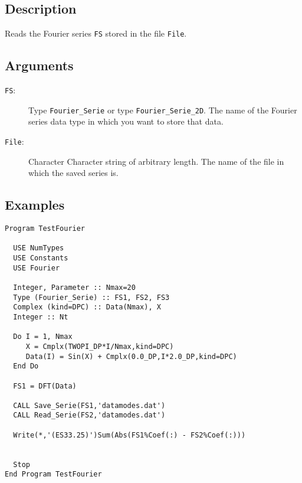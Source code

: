 \subsection{Description}

Reads the Fourier series \texttt{FS} stored in the file \texttt{File}.

\subsection{Arguments}

\begin{description}
\item[\texttt{FS}:] Type \texttt{Fourier\_Serie} or type
  \texttt{Fourier\_Serie\_2D}. The name of the Fourier series data
  type in which you want to store that data.
\item[\texttt{File}:] Character Character string of arbitrary
  length. The name of the file in which the saved series is.
\end{description}

\subsection{Examples}

\begin{lstlisting}[emph=Read_Serie,
                   emphstyle=\color{blue},
                   frame=trBL,
                   caption=Reading a Fourier serie from a file.,
                   label=read_serie]
Program TestFourier

  USE NumTypes
  USE Constants
  USE Fourier

  Integer, Parameter :: Nmax=20
  Type (Fourier_Serie) :: FS1, FS2, FS3
  Complex (kind=DPC) :: Data(Nmax), X
  Integer :: Nt

  Do I = 1, Nmax
     X = Cmplx(TWOPI_DP*I/Nmax,kind=DPC)
     Data(I) = Sin(X) + Cmplx(0.0_DP,I*2.0_DP,kind=DPC)
  End Do

  FS1 = DFT(Data)

  CALL Save_Serie(FS1,'datamodes.dat')
  CALL Read_Serie(FS2,'datamodes.dat')

  Write(*,'(ES33.25)')Sum(Abs(FS1%Coef(:) - FS2%Coef(:)))


  Stop
End Program TestFourier
\end{lstlisting}


